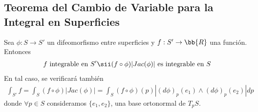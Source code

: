 \subsection{Teorema del Cambio de Variable para la Integral en Superficies}
\begin{teo}\label{teo:cambio_variable_integral_sup}
    Sea $\phi: S \to S'$ un difeomorfismo entre superficies y $f: S'\to \bb{R}$ una función. Entonces
    \begin{gather*}
        f \text{ integrable en $S'$} \sii (f\circ \phi)|Jac(\phi)|\text{ es integrable en $S$}
    \end{gather*}
    En tal caso, se verificará también
    \begin{gather*}
        \int_{S'}f = \int_S (f\circ \phi) |Jac(\phi)| = \int_S (f\circ \phi)(p)|(d\phi)_p(e_1) \wedge (d\phi)_p(e_2)| dp
    \end{gather*}
    donde $\forall p \in S$ consideramos $\{e_1, e_2\}$, una base ortonormal de $T_pS$.


\end{teo}
